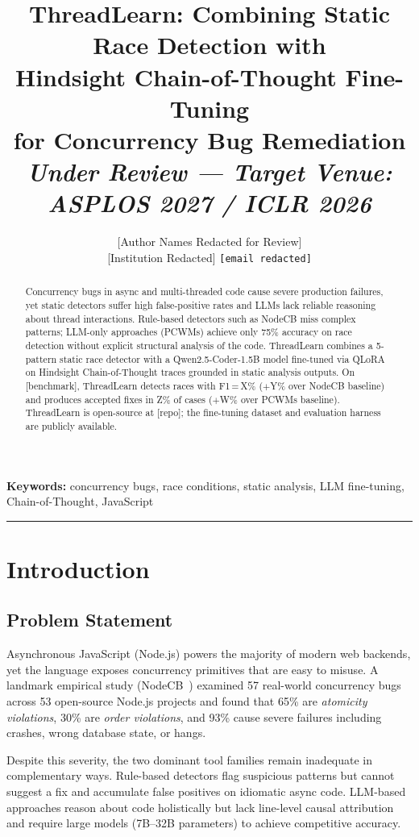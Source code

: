\documentclass[11pt]{article}
\title{%
  \large\textbf{ThreadLearn: Combining Static Race Detection with}\\[2pt]
  \large\textbf{Hindsight Chain-of-Thought Fine-Tuning}\\[2pt]
  \large\textbf{for Concurrency Bug Remediation}\\[8pt]
  \normalsize\textit{Under Review --- Target Venue: ASPLOS 2027 / ICLR 2026}
}
\author{%
  [Author Names Redacted for Review]\\[2pt]
  \small[Institution Redacted]\quad
  \small\texttt{[email redacted]}
}
\date{}
\begin{document}
\maketitle
\thispagestyle{fancy}

\begin{abstract}
\noindent
Concurrency bugs in async and multi-threaded code cause severe production
failures, yet static detectors suffer high false-positive rates and LLMs lack
reliable reasoning about thread interactions.
Rule-based detectors such as NodeCB miss complex patterns; LLM-only approaches
(PCWMs) achieve only 75\% accuracy on race detection without explicit structural
analysis of the code.
ThreadLearn combines a 5-pattern static race detector with a Qwen2.5-Coder-1.5B
model fine-tuned via QLoRA on Hindsight Chain-of-Thought traces grounded in
static analysis outputs.
On [benchmark], ThreadLearn detects races with F1\,=\,X\% ($+$Y\% over
NodeCB baseline) and produces accepted fixes in Z\% of cases
($+$W\% over PCWMs baseline).
ThreadLearn is open-source at [repo]; the fine-tuning dataset and evaluation
harness are publicly available.
\end{abstract}

\noindent\textbf{Keywords:} concurrency bugs, race conditions, static analysis,
LLM fine-tuning, Chain-of-Thought, JavaScript

\bigskip\hrule\bigskip

\section{Introduction}
\label{sec:intro}

\subsection{Problem Statement}

Asynchronous JavaScript (Node.js) powers the majority of modern web backends,
yet the language exposes concurrency primitives that are easy to misuse.
A landmark empirical study (NodeCB~\cite{nodecb2017}) examined 57 real-world
concurrency bugs across 53 open-source Node.js projects and found that
65\% are \emph{atomicity violations}, 30\% are \emph{order violations}, and
93\% cause severe failures including crashes, wrong database state, or hangs.

Despite this severity, the two dominant tool families remain inadequate in
complementary ways.
Rule-based detectors flag suspicious patterns but cannot suggest a fix and
accumulate false positives on idiomatic async code.
LLM-based approaches reason about code holistically but lack line-level causal
attribution and require large models (7B--32B parameters) to achieve competitive
accuracy.
\end{document}
